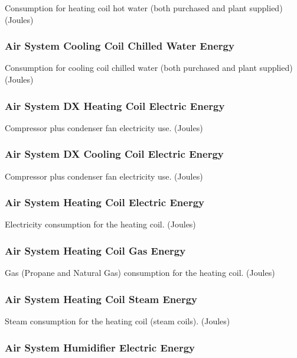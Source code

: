 Consumption for heating coil hot water (both purchased and plant supplied) (Joules)

\subsubsection{Air System Cooling Coil Chilled Water Energy}\label{air-system-cooling-coil-chilled-water-energy}

Consumption for cooling coil chilled water (both purchased and plant supplied) (Joules)

\subsubsection{Air System DX Heating Coil Electric Energy}\label{air-system-dx-heating-coil-electric-energy}

Compressor plus condenser fan electricity use. (Joules)

\subsubsection{Air System DX Cooling Coil Electric Energy}\label{air-system-dx-cooling-coil-electric-energy}

Compressor plus condenser fan electricity use. (Joules)

\subsubsection{Air System Heating Coil Electric Energy}\label{air-system-heating-coil-electric-energy}

Electricity consumption for the heating coil. (Joules)

\subsubsection{Air System Heating Coil Gas Energy}\label{air-system-heating-coil-gas-energy}

Gas (Propane and Natural Gas) consumption for the heating coil. (Joules)

\subsubsection{Air System Heating Coil Steam Energy}\label{air-system-heating-coil-steam-energy}

Steam consumption for the heating coil (steam coils). (Joules)

\subsubsection{Air System Humidifier Electric Energy}\label{air-system-humidifier-electric-energy}

